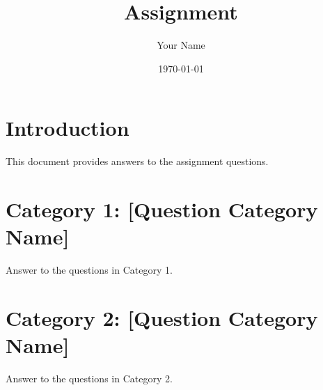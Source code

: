 \documentclass[a4paper,12pt]{article}
\title{Assignment}
\author{Your Name}
\date{\today}
\begin{document}
\maketitle

\section{Introduction}
This document provides answers to the assignment questions.

\section{Category 1: [Question Category Name]}
Answer to the questions in Category 1.

\section{Category 2: [Question Category Name]}
Answer to the questions in Category 2.
\end{document}
